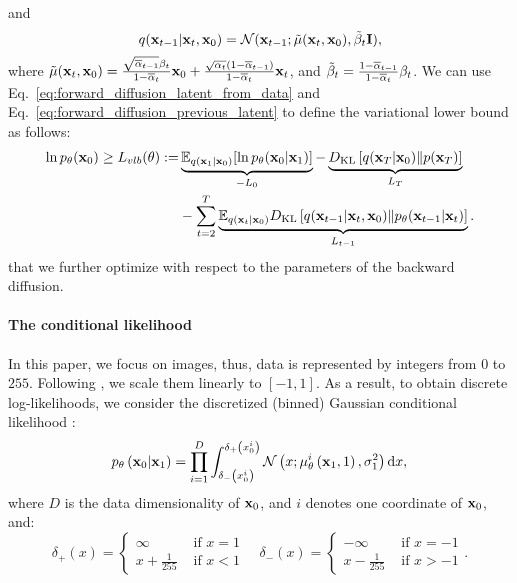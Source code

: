 and 
\begin{equation}\label{eq:forward_diffusion_previous_latent}
q(\rvx_{t-1}|\rvx_{t}, \rvx_0) = \mathcal{N}(\rvx_{t-1}; \Tilde{\mu}(\rvx_t, \rvx_0), \Tilde{\beta}_t \mathbf{I}) ,
\end{equation}
where $\Tilde{\mu}({\mathbf{x}}_t, {\mathbf{x}}_0) = \frac{\sqrt{\overline{\alpha}_{t-1}} \beta_{t}}{1-\overline{\alpha}_{t}} {\mathbf{x}}_0 + \frac{\sqrt{\alpha_{t}}\left(1-\overline{\alpha}_{t-1}\right)}{1-\overline{\alpha}_{t}} {\mathbf{x}}_{t}$, 
and $\Tilde{\beta}_{t}=\frac{1-\overline{\alpha}_{t-1}}{1-\overline{\alpha}_{t}} \beta_{t}$. We can use Eq.~\ref{eq:forward_diffusion_latent_from_data} and Eq.~\ref{eq:forward_diffusion_previous_latent} to define the variational lower bound as follows:
\begin{align} \label{eq:diff_elbo}
    \ln p_{\theta}(\rvx_0) \geq L_{vlb}(\theta) := &\underbrace{\E_{q(\rvx_1|\rvx_0)}[\ln p_{\theta}(\rvx_0|\rvx_1)]}_{-L_0} - \underbrace{\KL{q(\rvx_T |\rvx_0)}{p(\rvx_T)}}_{L_T} \notag \\
    & - \sum_{t=2}^T \underbrace{\E_{q(\rvx_t|\rvx_0)} \KL{q(\rvx_{t-1}|\rvx_t, \rvx_0)}{p_{\theta}(\rvx_{t-1}|\rvx_t)}}_{L_{t-1}}.
\end{align}
that we further optimize with respect to the parameters of the backward diffusion.

\paragraph{The conditional likelihood} 
In this paper, we focus on images, thus, data is represented by integers from $0$ to $255$. Following \citet{ho2020denoising}, we scale them linearly to $[-1, 1]$. As a result, to obtain discrete log-likelihoods, we consider the discretized (binned) Gaussian conditional likelihood \cite{ho2020denoising}:
\begin{equation}\label{eq:discretized_Gaussian}
    p_{\theta}\left(\rvx_{0} | \rvx_{1}\right)=\prod_{i=1}^{D} \int_{\delta_{-}\left(x_{0}^{i}\right)}^{\delta_{+}\left(x_{0}^{i}\right)} \mathcal{N}\left(x ; \mu_{\theta}^{i}\left(\mathbf{x}_{1}, 1\right), \sigma_{1}^{2}\right) \mathrm{d} x, 
\end{equation}
where $D$ is the data dimensionality of ${\mathbf{x}}_0$, and $i$ denotes one coordinate of ${\mathbf{x}}_0$, and:
\begin{equation}
    \delta_{+}(x)=\left\{\begin{array}{ll}
\infty & \text { if } x=1 \\
x+\frac{1}{255} & \text { if } x<1
\end{array} \quad \delta_{-}(x)= \begin{cases}-\infty & \text { if } x=-1 \\
x-\frac{1}{255} & \text { if } x>-1\end{cases}\right. .
\end{equation}

